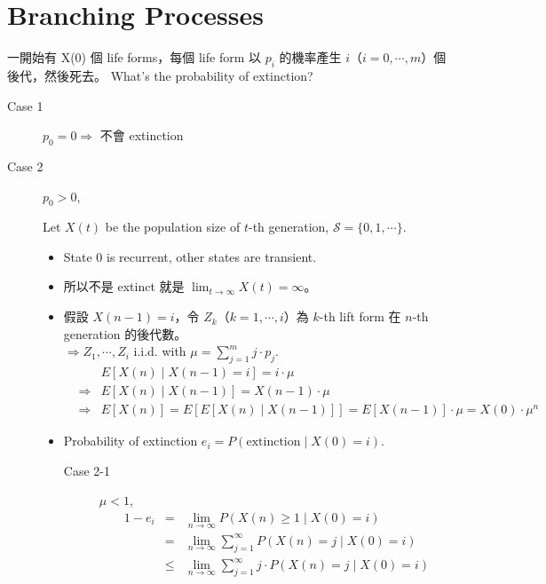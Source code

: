 \section{Branching Processes}

\begin{question}
一開始有 X(0) 個 life forms，每個 life form 以 $ p_{i} $ 的機率產生 $ i $（$ i = 0, \cdots, m $）個後代，然後死去。
What's the probability of extinction?

\begin{description}
  \item[Case 1] $ p_{0} = 0 \Rightarrow $ 不會 extinction
  \item[Case 2] $ p_{0} > 0 $,

    Let $ X(t) $ be the population size of $ t $-th generation, $ \mathcal{S} = \{ 0, 1, \cdots \} $.
    \begin{itemize}
      \item State 0 is recurrent, other states are transient.
      \item 所以不是 extinct 就是 $ \lim_{t \to \infty} X(t) = \infty $。
      \item 假設 $ X(n - 1) = i $，令 $ Z_{k} $（$ k = 1, \cdots, i $）為 $ k $-th lift form 在 $ n $-th generation 的後代數。 \\
        $ \Rightarrow Z_{1}, \cdots, Z_{i} $ i.i.d. with $ \mu = \sum_{j = 1}^{m} j \cdot p_{j} $.
        \begin{eqnarray*}
          & & E[X(n) \mid X(n - 1) = i] = i \cdot \mu \\
          & \Rightarrow & E[X(n) \mid X(n - 1)] = X(n - 1) \cdot \mu \\
          & \Rightarrow & E[X(n)] = E[E[X(n) \mid X(n - 1)]] = E[X(n - 1)] \cdot \mu = X(0) \cdot \mu^{n}
        \end{eqnarray*}
      \item Probability of extinction $ e_{i} = P(\text{extinction} \mid X(0) = i) $.
        \begin{description}
          \item[Case 2-1] $ \mu < 1 $,
            \begin{eqnarray*}
              1 - e_{i}
                & = & \lim_{n \to \infty} P(X(n) \ge 1 \mid X(0) = i) \\
                & = & \lim_{n \to \infty} \sum_{j = 1}^{\infty} P(X(n) = j \mid X(0) = i) \\
                & \le & \lim_{n \to \infty} \sum_{j = 1}^{\infty} j \cdot P(X(n) = j \mid X(0) = i) \\

\end{eqnarray*}
\end{description}
\end{itemize}
\end{description}
\end{question}

